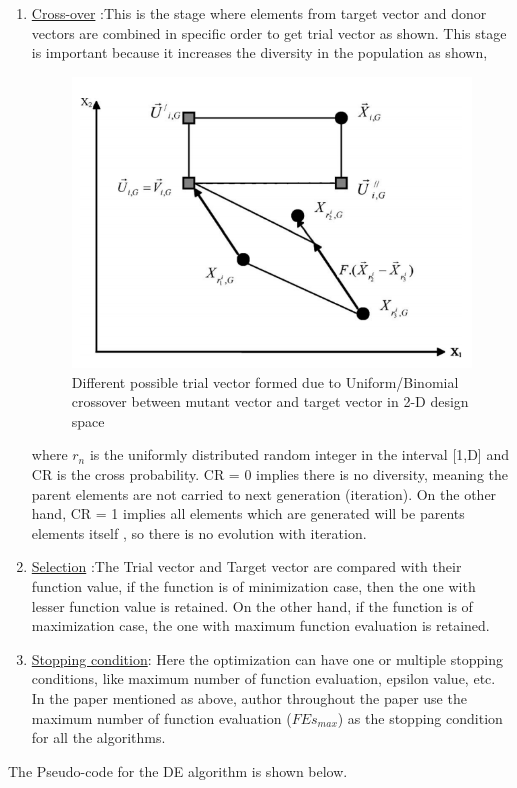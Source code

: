 \begin{enumerate}
\item \underline{Cross-over} :This is the stage where elements from target vector and donor vectors are combined in specific order to get trial vector as shown. This stage is important because it increases the diversity in the population as shown,
\begin{figure}[!ht]
    \centering
    \includegraphics[scale = 0.5]{figures/crossover.png}
    \caption{Different possible trial vector formed due to Uniform/Binomial crossover between mutant vector and target vector in 2-D design space\cite{storn}}
    \label{crossover}
\end{figure}

where $r_n$ is the uniformly distributed random integer in the interval [1,D] and CR is the cross probability. CR = 0 implies there is no diversity, meaning the parent elements are not carried to next generation (iteration). On the other hand, CR = 1 implies all elements which are generated will be parents elements itself , so there is no evolution with iteration.

\item \underline{Selection} :The Trial vector and Target vector are compared with their function value, if the function is of minimization case, then the one with lesser function value is retained. On the other hand, if the function is of maximization case, the one with maximum function evaluation is retained.


\item \underline{Stopping condition}: Here the optimization can have one or multiple stopping conditions, like maximum number of function evaluation, epsilon value, etc. In the paper mentioned as above, author throughout the paper use the maximum number of function evaluation ($FEs_{max}$) as the stopping condition for all the algorithms.
\end{enumerate}
The Pseudo-code for the DE algorithm is shown below.

